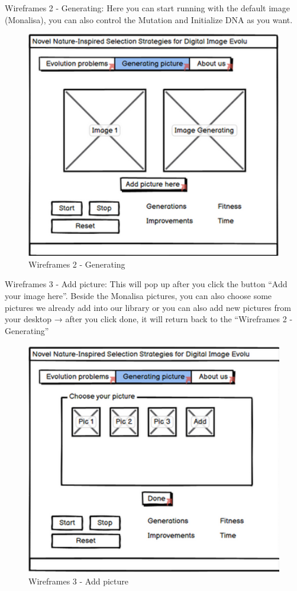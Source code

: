 Wireframes 2 - Generating: Here you can start running with the default image (Monalisa), you can also control the Mutation and Initialize DNA as you want.
\begin{figure}
\centering
\includegraphics[width=4.5in]{images/wf2.png}
\caption{Wireframes 2 - Generating}
\end{figure}
\newpage

 Wireframes 3 - Add picture: This will pop up after you click the button “Add your image here”. Beside the Monalisa pictures, you can also choose some pictures we already add into our library or you can also add new pictures from your desktop → after you click done, it will return back to the “Wireframes 2 - Generating”
\begin{figure}
\centering
\includegraphics[width=5in,height=4in]{images/wf3.png}
\caption{Wireframes 3 - Add picture}
\end{figure}
\newpage

